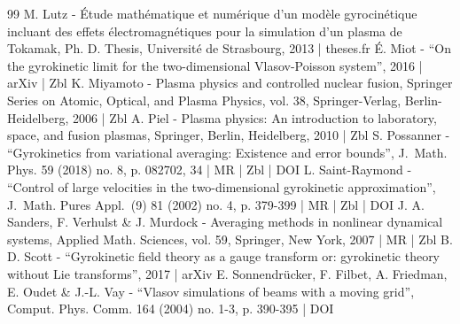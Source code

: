 \begin{thebibliography}{99}
M. Lutz - Étude mathématique et numérique d’un modèle gyrocinétique incluant des effets électromagnétiques pour la simulation d’un plasma de Tokamak, Ph. D. Thesis, Université de Strasbourg, 2013 | theses.fr
É. Miot - “On the gyrokinetic limit for the two-dimensional Vlasov-Poisson system”, 2016 | arXiv | Zbl
K. Miyamoto - Plasma physics and controlled nuclear fusion, Springer Series on Atomic, Optical, and Plasma Physics, vol. 38, Springer-Verlag, Berlin-Heidelberg, 2006 | Zbl
A. Piel - Plasma physics: An introduction to laboratory, space, and fusion plasmas, Springer, Berlin, Heidelberg, 2010 | Zbl
S. Possanner - “Gyrokinetics from variational averaging: Existence and error bounds”, J. Math. Phys. 59 (2018) no. 8, p. 082702, 34 | MR | Zbl | DOI
L. Saint-Raymond - “Control of large velocities in the two-dimensional gyrokinetic approximation”, J. Math. Pures Appl. (9) 81 (2002) no. 4, p. 379-399 | MR | Zbl | DOI
J. A. Sanders, F. Verhulst \& J. Murdock - Averaging methods in nonlinear dynamical systems, Applied Math. Sciences, vol. 59, Springer, New York, 2007 | MR | Zbl
B. D. Scott - “Gyrokinetic field theory as a gauge transform or: gyrokinetic theory without Lie transforms”, 2017 | arXiv
E. Sonnendrücker, F. Filbet, A. Friedman, E. Oudet \& J.-L. Vay - “Vlasov simulations of beams with a moving grid”, Comput. Phys. Comm. 164 (2004) no. 1-3, p. 390-395 | DOI
\end{thebibliography}
